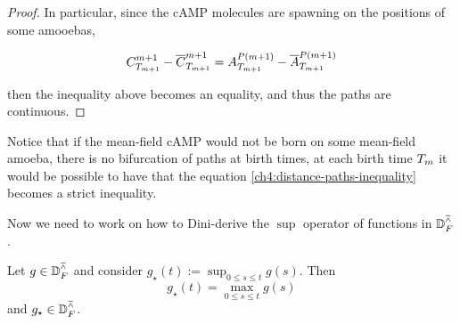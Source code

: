 \begin{proof}
In particular, since the cAMP molecules are spawning on the positions of some amooebas, \ie

\begin{equation*}
	C_{T_{m+1}}^{m+1} - \overline{C}_{T_{m+1}}^{m+1} = A_{T_{m+1}}^{P(m+1)} - \overline{A}_{T_{m+1}}^{P(m+1)}
\end{equation*}

then the inequality above becomes an equality, and thus the paths are continuous.
\end{proof}

\begin{remark}
	Notice that if the mean-field cAMP would not be born on some mean-field amoeba, \ie there is no bifurcation of paths at birth times, at each birth time $T_m$ it would be possible to have that the equation \ref{ch4:distance-paths-inequality} becomes a strict inequality.
\end{remark}

Now we need to work on how to Dini-derive the $\sup$ operator of functions in $\mathbb{D}_F^\barwedge$.

\begin{lemma}
Let $g \in \mathbb{D}_F^\barwedge$ and consider $g_\star (t) := \sup_{0\leq s \leq t} g(s)$.
Then
\begin{equation}
g_\star (t) = \max_{0\leq s \leq t} g(s)
\end{equation}
and $g_\star \in \mathbb{D}_F^\barwedge$.
\end{lemma}

